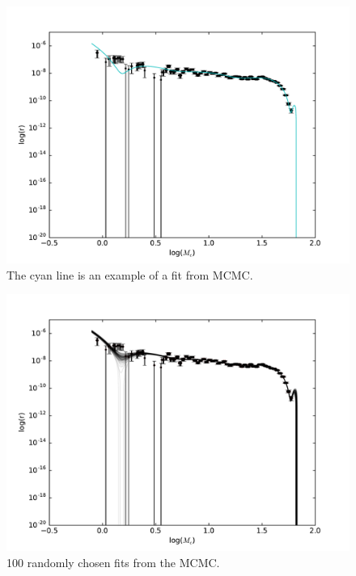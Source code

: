 \begin{figure}[ht]
  \includegraphics[width=\columnwidth]{img/line-MCMC.pdf}
  \caption{The cyan line is an example of a fit from MCMC.}
  \label{fig:line_MCMC}
\end{figure}

\begin{figure}[ht]
  \includegraphics[width=\columnwidth]{img/line-mcmc_err.pdf}
  \caption{100 randomly chosen fits from the MCMC.}
  \label{fig:line_MCMC_err}
\end{figure}

